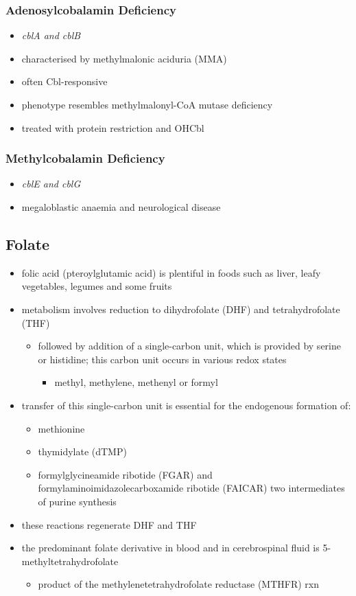\documentclass{scrartcl}
\begin{document}
\subsubsection{Adenosylcobalamin Deficiency}
\label{sec:orgaafb028}
\begin{itemize}
\item \emph{cblA and cblB}
\item characterised by methylmalonic aciduria (MMA)
\item often Cbl-responsive
\item phenotype resembles methylmalonyl-CoA mutase deficiency
\item treated with protein restriction and OHCbl
\end{itemize}

\subsubsection{Methylcobalamin Deficiency}
\label{sec:org69f00db}
\begin{itemize}
\item \emph{cblE and cblG}
\item megaloblastic anaemia and neurological disease
\end{itemize}
\subsection{Folate}
\label{sec:orgd645211}
\begin{itemize}
\item folic acid (pteroylglutamic acid) is plentiful in foods such as
liver, leafy vegetables, legumes and some fruits
\item metabolism involves reduction to dihydrofolate (DHF) and
tetrahydrofolate (THF)
\begin{itemize}
\item followed by addition of a single-carbon unit, which is provided by
serine or histidine; this carbon unit occurs in various redox
states
\begin{itemize}
\item methyl, methylene, methenyl or formyl
\end{itemize}
\end{itemize}
\item transfer of this single-carbon unit is essential for the endogenous
formation of:
\begin{itemize}
\item methionine
\item thymidylate (dTMP)
\item formylglycineamide ribotide (FGAR) and
formylaminoimidazolecarboxamide ribotide (FAICAR) two
intermediates of purine synthesis
\end{itemize}
\item these reactions regenerate DHF and THF
\item the predominant folate derivative in blood and in cerebrospinal
fluid is 5-methyltetrahydrofolate
\begin{itemize}
\item product of the methylenetetrahydrofolate reductase (MTHFR) rxn
\end{itemize}
\end{itemize}
\end{document}
